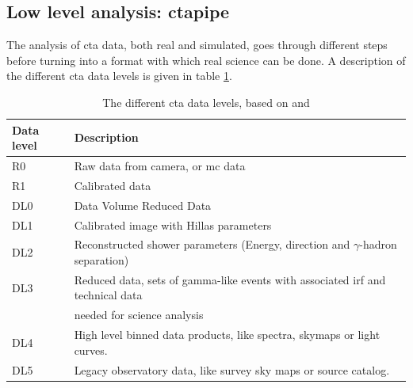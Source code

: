 \documentclass[main.tex]{subfiles}
\begin{document}
\subsection{Low level analysis: ctapipe} \label{sec:ctapipe}
The analysis of \gls{cta} data, both real and simulated, goes through different steps before turning into a format with which real science can be done. A description of the different \gls{cta} data levels is given in table \ref{tab:CTAdatalevels}. 


\begin{table}
  \centering
  \begin{tabular}{|l|l|}
    \hline
    Data level & Description \\
    \hline
    R0 & Raw data from camera, or \gls{mc} data\\
    R1 & Calibrated data \\
    DL0 & Data Volume Reduced Data \\
    DL1 & Calibrated image with Hillas parameters \\
    DL2 & Reconstructed shower parameters (Energy, direction and $\gamma$-hadron separation) \\
    DL3 & Reduced data, sets of gamma-like events with associated \gls{irf} and technical data\\
    & needed for science analysis \\
    DL4 & High level binned data products, like spectra, skymaps or light curves.\\
    DL5 & Legacy observatory data, like survey sky maps or source catalog. \\
    \hline
  \end{tabular}
  \caption{The different \gls{cta} data levels, based on \cite{ctapipe} and \cite{2015CTAdata}}
  \label{tab:CTAdatalevels}
\end{table}
\end{document}
